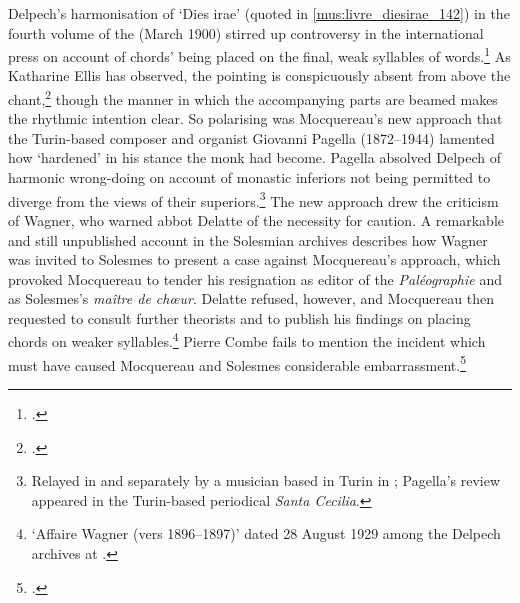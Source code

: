 \label{hl:dies_irae_mocquereau}\label{cc:moc_ictus}%
Delpech's harmonisation of `Dies irae' (quoted in \cref{mus:livre_diesirae_142}) in the fourth volume of the \ldo{} (March 1900) stirred up controversy in the international press on account of chords' being placed on the final, weak syllables of words.\footcite[142]{LivreOrgueChants1898}
As Katharine Ellis has observed, the pointing is conspicuously absent from above the chant,\footcite[64--6]{EllisPoliticsPlainchantfindesiecle2013} though the manner in which the accompanying parts are beamed makes the rhythmic intention clear.
So polarising was Mocquereau's new approach that the Turin-based composer and organist Giovanni Pagella (1872--1944) lamented how `hardened' in his stance the monk had become.
Pagella absolved Delpech of harmonic wrong-doing on account of monastic inferiors not being permitted to diverge from the views of their superiors.\footnote{Relayed in  and separately by a musician based in Turin in ; Pagella's review appeared in the Turin-based periodical \covid{}\emph{Santa Cecilia}.}
The new approach drew the criticism of Wagner, who warned abbot Delatte of the necessity for caution.
A remarkable and still unpublished account in the Solesmian archives describes how Wagner was invited to Solesmes to present a case against Mocquereau's approach, which provoked Mocquereau to tender his resignation as editor of the \emph{Paléographie} and as Solesmes's \emph{maître de chœur}.
Delatte refused, however, and Mocquereau then requested to consult further theorists and to publish his findings on placing chords on weaker syllables.\footnote{`Affaire Wagner (vers 1896--1897)' dated 28 August 1929 among the Delpech archives at \so{}.\label{fn:wagner_affair}}
Pierre Combe fails to mention the incident which must have caused Mocquereau and Solesmes considerable embarrassment.\footcites{CombeHistoirerestaurationchant1969}{CombeRestorationGregorianChant2003}

